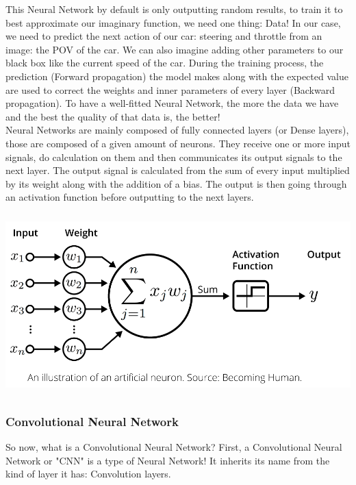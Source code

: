 \documentclass[12pt]{article}
\begin{document}
This Neural Network by default is only outputting random results, to train it to best approximate our imaginary function, we need one thing: Data! In our case, we need to predict the next action of our car: steering and throttle from an image: the POV of the car. We can also imagine adding other parameters to our black box like the current speed of the car.
During the training process, the prediction (Forward propagation) the model makes along with the expected value are used to correct the weights and inner parameters of every layer (Backward propagation). To have a well-fitted Neural Network, the more the data we have and the best the quality of that data is, the better! \\

Neural Networks are mainly composed of fully connected layers (or Dense layers), those are composed of a given amount of neurons. They receive one or more input signals, do calculation on them and then communicates its output signals to the next layer. The output signal is calculated from the sum of every input multiplied by its weight along with the addition of a bias. The output is then going through an activation function before outputting to the next layers. \\

\centerline{\includegraphics[height=7cm]{../../docs/activation-function.png}}

\subsubsection{Convolutional Neural Network}
So now, what is a Convolutional Neural Network?
First, a Convolutional Neural Network or "CNN" is a type of Neural Network! It inherits its name from the kind of layer it has: Convolution layers. \\
\end{document}
